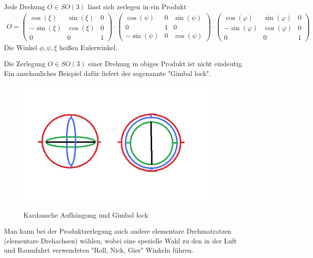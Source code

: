 \begin{Satz}
Jede Drehung  $O \in SO(3)$  lässt sich zerlegen in ein Produkt
\begin{align*}
O = 
\begin{pmatrix}
 \cos(\xi) &  \sin(\xi)  & 0\\ 
 - \sin(\xi) & \cos(\xi) & 0 \\
0 & 0 & 1 
\end{pmatrix} 
\cdot
\begin{pmatrix}
 \cos(\psi) & 0 &   \sin(\psi) \\ 
0 & 1 & 0 \\ 
- \sin(\psi) & 0& \cos(\psi)
\end{pmatrix}
\cdot \begin{pmatrix}
 \cos(\varphi) &  \sin(\varphi)  & 0\\ 
 - \sin(\varphi) & \cos(\varphi) & 0 \\
0 & 0 & 1 
\end{pmatrix} 
\end{align*} 
Die Winkel $\phi, \psi, \xi$ heißen  Eulerwinkel. 
\end{Satz}

\begin{Bemerkung}
Die  Zerlegung  $O \in SO(3)$  einer Drehung in obiges Produkt ist  nicht eindeutig.
Ein anschauliches Beispiel dafür liefert der sogenannte "Gimbal lock".
\end{Bemerkung}

\begin{figure}[H]
    \centering
    \includegraphics[width=0.9\textwidth]{images/gimbalLock.jpg}
    \label{fig:gimbal+lock}
    \caption{Kardansche Aufhängung und Gimbal lock}
\end{figure}

\begin{Bemerkung}
Man kann bei der Produktzerlegung auch andere elementare Drehmatratzen (elementare Drehachsen)  wählen, wobei
eine spezielle Wahl  zu den in der Luft und Raumfahrt verwendeten "Roll, Nick, Gier" Winkeln führen.
\end{Bemerkung}

